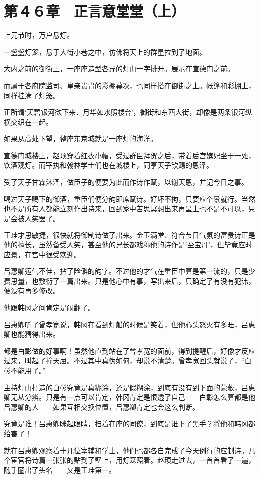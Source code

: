 \section{第４６章　正言意堂堂（上）}

上元节时，万户悬灯。

一盏盏灯笼，悬于大街小巷之中，仿佛将天上的群星拉到了地面。

大内之前的御街上，一座座造型各异的灯山一字排开。展示在宣德门之前。

而属于各府院监司、皇亲贵胄的彩棚幕次，也同样搭在御街之上。帐篷和彩棚上，同样挂满了灯笼。

正所谓‘天碧银河欲下来．月华如水照楼台’，御街和东西大街，却像是两条银河纵横交织在一起。

如果从高处下望，整座东京城就是一座灯的海洋。

宣德门城楼上，赵顼穿着红衣小帽，受过群臣拜贺之后，带着后宫嫔妃坐于一处，饮酒观灯。而宰执和翰林学士们也在城楼上，同享天子钦赐的恩泽。

受了天子甘霖沐泽，做臣子的便要为此而作诗作赋，以谢天恩，并记今日之事。

喝过天子赐下的御酒，重臣们便分韵即席赋诗。好坏不拘，只要应个景就行。当然也不是所有人都能立刻作出诗来，回到家中苦思冥想出来再呈上也不是不可以，只是会被人笑罢了。

王珪才思敏捷，很快就将御制诗做了出来。金玉满堂、符合节日气氛的富贵诗正是他的擅长，虽然备受人笑，甚至他的兄长都戏称他的诗作是‘至宝丹’，但毕竟应时应景，在宫中很受欢迎。

吕惠卿运气不佳，拈了险僻的韵字。不过他的才气在重臣中算是第一流的，只是少费思量，也敷衍了一篇出来。只是他心中有事，写出来后，只确定了有没有犯讳，便没有再多修改。

他跟韩冈之间肯定是闹翻了。

吕惠卿听了曾孝宽说，韩冈在看到灯船的时候是笑着，但他心头怒火有多旺，吕惠卿也能猜得出来。

都是白彰做的好事啊！虽然他直到站在了曾孝宽的面前，得到提醒后，好像才反应过来，叫起了撞天屈。不过其中真伪如何，却说不清楚。曾孝宽回头就说了，“白彰不能用了。”

主持灯山打造的白彰究竟是真糊涂，还是假糊涂，到底有没有到下面的蒙蔽，吕惠卿无从分辨。只是有一点可以肯定，韩冈肯定是恨透了自己——白彰怎么算都是他吕惠卿的人——如果互相交换位置，吕惠卿肯定也会这么判断。

究竟是谁！吕惠卿眯起眼睛，扫着在座的同僚，到底是谁下了黑手？将他和韩冈都给害了！

就在吕惠卿观察着十几位宰辅和学士，他们也都各自完成了今天例行的应制诗。几个宦官将诗篇一张张的贴到了壁上，用灯笼照着。赵顼走过去，一首首看了一遍，随手圈出了头名——又是王珪第一。

